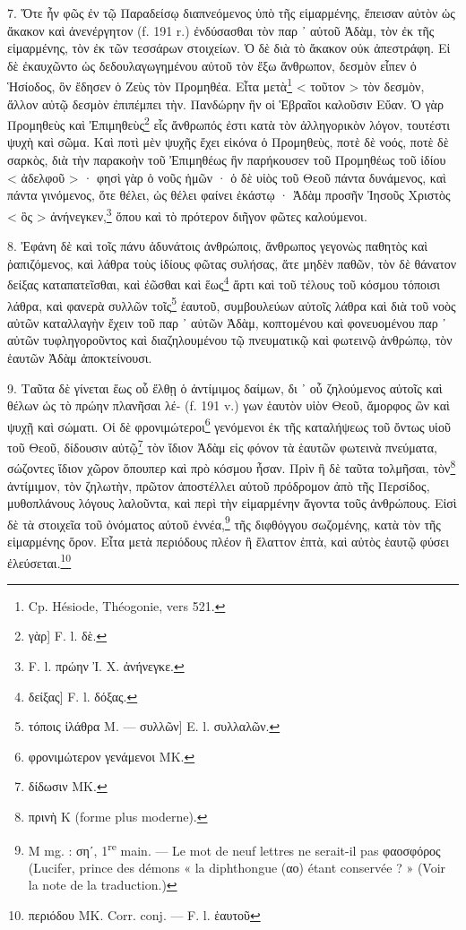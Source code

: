\documentclass[a4paper, 11pt, oneside, polutonikogreek, french]{article}
\begin{document}
7. Ὅτε ἦν φῶς ἐν τῷ Παραδείσῳ διαπνεόμενος ὑπὸ τῆς εἱμαρμένης, ἔπεισαν αὐτὸν ὡς ἄκακον καὶ ἀνενέργητον (f. 191 r.) ἐνδύσασθαι τὸν παρ ᾽ αὐτοῦ Ἀδὰμ, τὸν ἐκ τῆς εἱμαρμένης, τὸν ἐκ τῶν τεσσάρων στοιχείων. Ὁ δὲ διὰ τὸ ἄκακον οὐκ ἀπεστράφη. Εἰ δὲ ἐκαυχῶντο ὡς δεδουλαγωγημένου αὐτοῦ τὸν ἔξω ἄνθρωπον, δεσμὸν εἶπεν ὁ Ἡσίοδος, ὃν ἔδησεν ὁ Ζεὺς τὸν Προμηθέα. Εἶτα μετὰ\footnote{Cp. Hésiode, Théogonie, vers 521.} < τοῦτον > τὸν δεσμὸν, ἄλλον αὐτῷ δεσμὸν ἐπιπέμπει τὴν. Πανδώρην ἣν οἱ Ἑβραῖοι καλοῦσιν Εὔαν. Ὁ γὰρ Προμηθεὺς καὶ Ἐπιμηθεὺς\footnote{γὰρ] F. l. δὲ.} εἷς ἄνθρωπός ἐστι κατὰ τὸν ἀλληγορικὸν λόγον, τουτέστι ψυχὴ καὶ σῶμα. Καὶ ποτὶ μὲν ψυχῆς ἔχει εἰκόνα ὁ Προμηθεὺς, ποτὲ δὲ νοός, ποτὲ δὲ σαρκὸς, διὰ τὴν παρακοὴν τοῦ Ἐπιμηθέως ἣν παρήκουσεν τοῦ Προμηθέως τοῦ ἰδίου < ἀδελφοῦ > · φησὶ γὰρ ὁ νοῦς ἡμῶν · ὁ δὲ υἱὸς τοῦ Θεοῦ πάντα δυνάμενος, καὶ πάντα γινόμενος, ὅτε θέλει, ὠς θέλει φαίνει ἑκάστῳ · Ἀδὰμ προσῆν Ἰησοῦς Χριστὸς < ὃς > ἀνήνεγκεν,\footnote{F. l. πρώην Ἰ. Χ. ἀνήνεγκε.} ὅπου καὶ τὸ πρότερον διῆγον φῶτες καλούμενοι.

8. Ἐφάνη δὲ καὶ τοῖς πάνυ ἀδυνάτοις ἀνθρώποις, ἄνθρωπος γεγονὼς παθητὸς καὶ ῥαπιζόμενος, καὶ λάθρα τοὺς ἰδίους φῶτας συλήσας, ἅτε μηδὲν παθῶν, τὸν δὲ θάνατον δείξας καταπατεῖσθαι, καὶ ἐῶσθαι καὶ ἕως\footnote{δείξας] F. l. δόξας.} ἄρτι καὶ τοῦ τέλους τοῦ κόσμου τόποισι λάθρα, καὶ φανερὰ συλλῶν τοῖς\footnote{τόποις ἰλάθρα M. --- συλλῶν] E. l. συλλαλῶν.} ἑαυτοῦ, συμβουλεύων αὐτοῖς λάθρα καὶ διὰ τοῦ νοὸς αὐτῶν καταλλαγὴν ἔχειν τοῦ παρ ᾽ αὐτῶν Ἀδὰμ, κοπτομένου καὶ φονευομένου παρ ᾽ αὐτῶν τυφληγοροῦντος καὶ διαζηλουμένου τῷ πνευματικῷ καὶ φωτεινῷ ἀνθρώπῳ, τὸν ἑαυτῶν Ἀδὰμ ἀποκτείνουσι.

9. Ταῦτα δὲ γίνεται ἕως οὗ ἔλθῃ ὁ ἀντίμιμος δαίμων, δι ᾽ οὗ ζηλούμενος αὐτοῖς καὶ θέλων ὡς τὸ πρώην πλανῆσαι λέ- (f. 191 v.) γων ἑαυτὸν υἱὸν Θεοῦ, ἄμορφος ὢν καὶ ψυχῇ καὶ σώματι. Οἱ δὲ φρονιμώτεροι\footnote{φρονιμώτερον γενάμενοι MK.} γενόμενοι ἐκ τῆς καταλήψεως τοῦ ὄντως υἱοῦ τοῦ Θεοῦ, δίδουσιν αὐτῷ\footnote{δίδωσιν MK.} τὸν ἴδιον Ἀδὰμ εἰς φόνον τὰ ἑαυτῶν φωτεινὰ πνεύματα, σώζοντες ἴδιον χῶρον ὅπουπερ καὶ πρὸ κόσμου ἦσαν. Πρὶν ἢ δὲ ταῦτα τολμῆσαι, τὸν\footnote{πρινὴ K (forme plus moderne).} ἀντίμιμον, τὸν ζηλωτὴν, πρῶτον ἀποστέλλει αὑτοῦ πρόδρομον ἀπὸ τῆς Περσίδος, μυθοπλάνους λόγους λαλοῦντα, καὶ περὶ τὴν εἱμαρμένην ἄγοντα τοῦς ἀνθρώπους. Εἰσὶ δὲ τὰ στοιχεῖα τοῦ ὀνόματος αὐτοῦ ἐννέα,\footnote{M mg. : σηʹ, 1\textsuperscript{re} main. --- Le mot de neuf lettres ne serait-il pas φαοσφόρος (Lucifer, prince des démons « la diphthongue (αο) étant conservée ? » (Voir la note de la traduction.)} τῆς διφθόγγου σωζομένης, κατὰ τὸν τῆς εἱμαρμένης ὅρον. Εἶτα μετὰ περιόδους πλέον ἢ ἔλαττον ἑπτὰ, καὶ αὐτὸς ἑαυτῷ φύσει ἐλεύσεται.\footnote{περιόδου MK. Corr. conj. --- F. l. ἑαυτοῦ}
\end{document}
